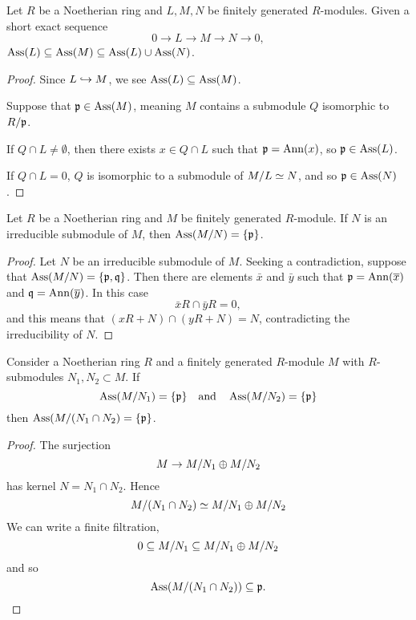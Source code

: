 \documentclass{ximera}
\begin{document}
\begin{proposition}\label{P:subsetassassin}
  Let $R$ be a Noetherian ring and $L,M,N$ be finitely generated
  $R$-modules. Given a short exact sequence
  \[
  0 \to L \to M \to N \to 0,
  \]
  $\operatorname{Ass}(L) \subseteq \operatorname{Ass}(M) \subseteq \operatorname{Ass}(L) \cup \operatorname{Ass}(N)$.
  \begin{proof}
    Since $L\hookrightarrow M$, we see $\operatorname{Ass}(L) \subseteq \operatorname{Ass}(M)$.

    Suppose that $\mathfrak{p}\in\operatorname{Ass}(M)$, meaning $M$ contains a submodule $Q$
    isomorphic to $R/\mathfrak{p}$.

    If $Q\cap L \ne \emptyset$, then there exists $x\in Q\cap L$ such
    that $\mathfrak{p} = \operatorname{Ann}(x)$, so $\mathfrak{p}\in\operatorname{Ass}(L)$.

    If $Q\cap L = 0$, $Q$ is isomorphic to a submodule of $M/L\simeq N$,
    and so $\mathfrak{p}\in\operatorname{Ass}(N)$.
  \end{proof}
\end{proposition}







\begin{lemma}\label{L:irrassassin}
  Let $R$ be a Noetherian ring and $M$ be finitely generated
  $R$-module. If $N$ is an irreducible submodule of $M$, then
  $\operatorname{Ass}(M/N)=\{\mathfrak{p}\}$.
  \begin{proof}
    Let $N$ be an irreducible submodule of $M$. Seeking a
    contradiction, suppose that $\operatorname{Ass}(M/N) = \{\mathfrak{p},\mathfrak{q}\}$. Then there
    are elements $\bar{x}$ and $\bar{y}$ such that $\mathfrak{p}=\operatorname{Ann}(\overline{x})$
    and $\mathfrak{q}=\operatorname{Ann}(\overline{y})$. In this case
    \[
    \bar{x}R \cap \bar{y}R = 0,
    \]
    and this means that $(xR +N)\cap(yR+N) = N$, contradicting the
    irreducibility of $N$.
  \end{proof}
\end{lemma}


\begin{lemma}\label{L:intersectassassin}
  Consider a Noetherian ring $R$ and a finitely generated $R$-module
  $M$ with $R$-submodules $N_1,N_2\subset M$. If
  \[
  \operatorname{Ass}(M/N_1) = \{\mathfrak{p}\} \quad\text{and}\quad \operatorname{Ass}(M/N_2) = \{\mathfrak{p}\}
  \]
  then $\operatorname{Ass}(M/(N_1\cap N_2) = \{\mathfrak{p}\}$.
  \begin{proof}
    The surjection
    \[
    M \to M/N_1\oplus M/N_2
    \]
    has kernel $N = N_1\cap N_2$. Hence
    \[
    M/(N_1\cap N_2)\simeq M/N_1\oplus M/N_2
    \]
    We can write a finite filtration,
    \[
    0 \subseteq M/N_1 \subseteq M/N_1\oplus M/N_2
    \]
    and so
    \[
    \operatorname{Ass}(M/(N_1\cap N_2)) \subseteq{\mathfrak{p}}. 
    \]
  \end{proof}
\end{lemma}
\end{document}
